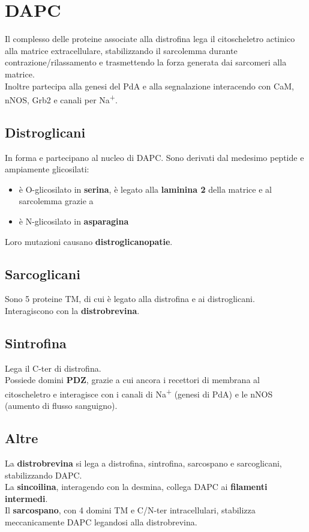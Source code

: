 \documentclass[a4paper, 12pt]{article}
\begin{document}
\section{DAPC}
Il complesso delle proteine associate alla distrofina lega il citoscheletro actinico alla matrice extracellulare, stabilizzando il sarcolemma durante contrazione/rilassamento e trasmettendo la forza generata dai sarcomeri alla matrice.\\
Inoltre partecipa alla genesi del PdA e alla segnalazione interacendo con CaM, nNOS, Grb2 e canali per Na\textsuperscript{+}.

\subsection{Distroglicani}
In forma {\textalpha} e {\textbeta} partecipano al nucleo di DAPC. Sono derivati dal medesimo peptide e ampiamente glicosilati:
\begin{itemize}
  \item {\textalpha} è O-glicosilato in \textbf{serina}, è legato alla \textbf{laminina 2} della matrice e al sarcolemma grazie a {\textbeta}
  \item {\textbeta} è N-glicosilato in \textbf{asparagina}
\end{itemize}
Loro mutazioni causano \textbf{distroglicanopatie}.

\subsection{Sarcoglicani}
Sono 5 proteine TM, di cui {\textgamma} è legato alla distrofina e {\textdelta} ai distroglicani.\\
Interagiscono con la \textbf{distrobrevina}.

\subsection{Sintrofina}
Lega il C-ter di distrofina.\\
Possiede domini \textbf{PDZ}, grazie a cui ancora i recettori di membrana al citoscheletro e interagisce con i canali di Na\textsuperscript{+} (genesi di PdA) e le nNOS (aumento di flusso sanguigno).

\subsection{Altre}
La \textbf{distrobrevina} si lega a distrofina, sintrofina, sarcospano e sarcoglicani, stabilizzando DAPC.\\
La \textbf{sincoilina}, interagendo con la desmina, collega DAPC ai \textbf{filamenti intermedi}.\\
Il \textbf{sarcospano}, con 4 domini TM e C/N-ter intracellulari, stabilizza meccanicamente DAPC legandosi alla distrobrevina.
\end{document}
